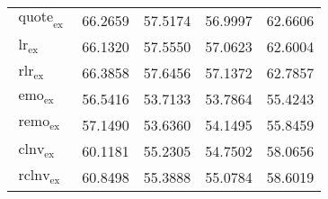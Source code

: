 \begin{table}[H]
\begin{tabular}{@{}p{5.7cm}SSSS@{}}
        $\operatorname{quote}_{\mathrm{ex}}$                                                                                                                                                                                                                   & 66.2659                      & 57.5174           & 56.9997           & 62.6606           \\
        $\operatorname{lr}_{\mathrm{ex}}$                                                                                                                                                                                                                      & 66.1320                      & 57.5550           & 57.0623           & 62.6004           \\
        $\operatorname{rlr}_{\mathrm{ex}}$                                                                                                                                                                                                                     & 66.3858                      & 57.6456           & 57.1372           & 62.7857           \\
        $\operatorname{emo}_{\mathrm{ex}}$                                                                                                                                                                                                                     & 56.5416                      & 53.7133           & 53.7864           & 55.4243           \\
        $\operatorname{remo}_{\mathrm{ex}}$                                                                                                                                                                                                                    & 57.1490                      & 53.6360           & 54.1495           & 55.8459           \\
        $\operatorname{clnv}_{\mathrm{ex}}$                                                                                                                                                                                                                    & 60.1181                      & 55.2305           & 54.7502           & 58.0656           \\
        $\operatorname{rclnv}_{\mathrm{ex}}$                                                                                                                                                                                                                   & 60.8498                      & 55.3888           & 55.0784           & 58.6019           \\ \midrule

\end{tabular}
\end{table}
